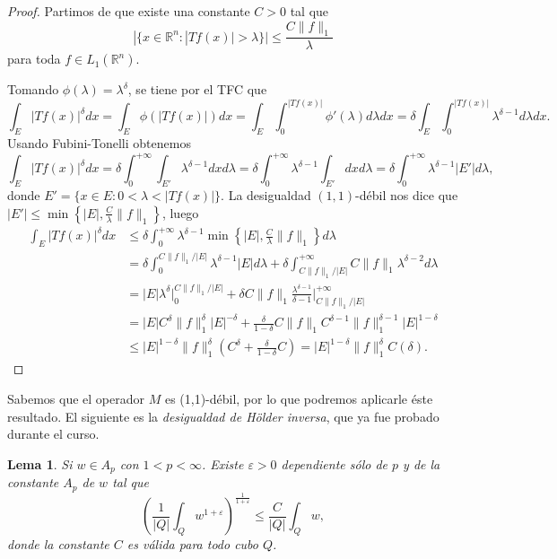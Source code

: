 \documentclass[12pt,english]{article}
\newtheorem{lemma}[theorem]{Lema}
\theoremstyle{definition}
\theoremstyle{remark}
\begin{document}
\begin{proof}
	
	Partimos de que existe una constante $C>0$ tal que
	\[|\{x\in\mathbb{R}^n:|Tf(x)|>\lambda\}|\leq\frac{C\|f\|_1}{\lambda}\]
	para toda $f\in L_1(\mathbb{R}^n)$.
	
	Tomando $\phi(\lambda)=\lambda^\delta$, se tiene por el TFC que
	\[\int_E |Tf(x)|^\delta dx=\int_E \phi(|Tf(x)|)dx=\int_E\int_0^{|Tf(x)|}\phi'(\lambda)d\lambda dx=\delta\int_E\int_0^{|Tf(x)|}\lambda^{\delta-1}d\lambda dx.\]
	Usando Fubini-Tonelli obtenemos
	\[\int_E |Tf(x)|^\delta dx=\delta\int_0^{+\infty}\int_{E'}\lambda^{\delta-1}dxd\lambda=\delta\int_0^{+\infty}\lambda^{\delta-1}\int_{E'}dxd\lambda=\delta\int_0^{+\infty}\lambda^{\delta-1}|E'|d\lambda,\]
	donde $E'=\{x\in E:0<\lambda<|Tf(x)|\}$. La desigualdad $(1,1)$-débil nos dice que $|E'|\leq\min\left\{|E|,\frac{C}{\lambda}\|f\|_1\right\}$, luego
	\begin{align*}
	\int_E |Tf(x)|^\delta dx&\leq\delta\int_0^{+\infty} \lambda^{\delta-1}\min\left\{|E|,\frac{C}{\lambda}\|f\|_1\right\}d\lambda \\
	&=\delta \int_0^{C\|f\|_1/|E|}\lambda^{\delta-1}|E|d\lambda+\delta\int_{C\|f\|_1/|E|}^{+\infty} C\|f\|_1\lambda^{\delta-2}d\lambda \\
	&=|E|\lambda^\delta\Big|_0^{C\|f\|_1/|E|}+\delta C \|f\|_1 \frac{\lambda^{\delta-1}}{\delta-1}\Big|_{C\|f\|_1/|E|}^{+\infty} \\
	&=|E|C^\delta \|f\|_1^\delta |E|^{-\delta}+\frac{\delta}{1-\delta}C\|f\|_1 C^{\delta-1}\|f\|_1^{\delta-1}|E|^{1-\delta} \\
	&\leq |E|^{1-\delta}\|f\|_1^\delta\left(C^\delta+\frac{\delta}{1-\delta}C\right)=|E|^{1-\delta}\|f\|_1^\delta C(\delta).
	\end{align*}
\end{proof}

Sabemos que el operador $M$ es (1,1)-débil, por lo que podremos aplicarle éste resultado. El siguiente es la \emph{desigualdad de Hölder inversa}, que ya fue probado durante el curso.

\begin{lemma} \label{lm: inverse holder} Si $w\in A_p$ con $1<p<\infty$. Existe $\varepsilon>0$ dependiente sólo de $p$ y de la constante $A_p$ de $w$ tal que
	\[\left(\frac{1}{|Q|}\int_Q w^{1+\varepsilon}\right)^{\frac{1}{1+\varepsilon}}\leq \frac{C}{|Q|}\int_Q w,\]
	donde la constante $C$ es válida para todo cubo $Q$.
\end{lemma}
\end{document}
